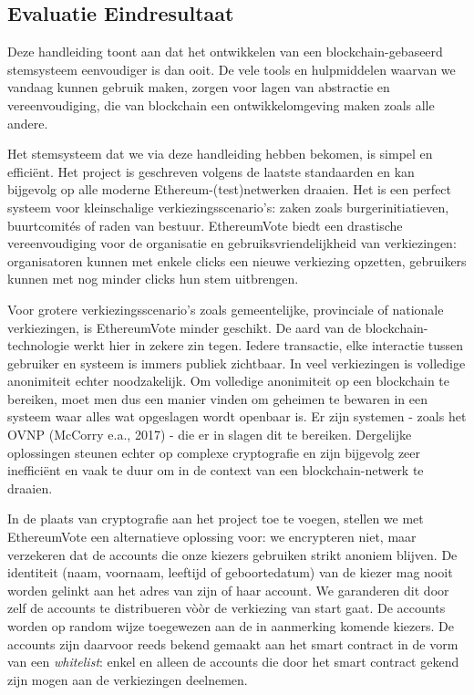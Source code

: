 	\subsection{Evaluatie Eindresultaat}
	Deze handleiding toont aan dat het ontwikkelen van een blockchain-gebaseerd stemsysteem eenvoudiger is dan ooit. De vele tools en hulpmiddelen waarvan we vandaag kunnen gebruik maken, zorgen voor lagen van abstractie en vereenvoudiging, die van blockchain een ontwikkelomgeving maken zoals alle andere.

	 Het stemsysteem dat we via deze handleiding hebben bekomen, is simpel en efficiënt. Het project is geschreven volgens de laatste standaarden en kan bijgevolg op alle moderne Ethereum-(test)netwerken draaien. Het is een perfect systeem voor kleinschalige verkiezingsscenario's: zaken zoals burgerinitiatieven, buurtcomités of raden van bestuur. EthereumVote biedt een drastische vereenvoudiging voor de organisatie en gebruiksvriendelijkheid van verkiezingen: organisatoren kunnen met enkele clicks een nieuwe verkiezing opzetten, gebruikers kunnen met nog minder clicks hun stem uitbrengen.
	 
	 Voor grotere verkiezingsscenario's zoals gemeentelijke, provinciale of nationale verkiezingen, is EthereumVote minder geschikt. De aard van de blockchain-technologie werkt hier in zekere zin tegen. Iedere transactie, elke interactie tussen gebruiker en systeem is immers publiek zichtbaar. In veel verkiezingen is volledige anonimiteit echter noodzakelijk. Om volledige anonimiteit op een blockchain te bereiken, moet men dus een manier vinden om geheimen te bewaren in een systeem waar alles wat opgeslagen wordt openbaar is. Er zijn systemen - zoals het OVNP (McCorry e.a., 2017) - die er in slagen dit te bereiken. Dergelijke oplossingen steunen echter op complexe cryptografie en zijn bijgevolg zeer inefficiënt en vaak te duur om in de context van een blockchain-netwerk te draaien.
	
	In de plaats van cryptografie aan het project toe te voegen, stellen we met EthereumVote een alternatieve oplossing voor: we encrypteren niet, maar verzekeren dat de accounts die onze kiezers gebruiken strikt anoniem blijven. De identiteit (naam, voornaam, leeftijd of geboortedatum) van de kiezer mag nooit worden gelinkt aan het adres van zijn of haar account. We garanderen dit door zelf de accounts te distribueren vòòr de verkiezing van start gaat. De accounts worden op random wijze toegewezen aan de in aanmerking komende kiezers. De accounts zijn daarvoor reeds bekend gemaakt aan het smart contract in de vorm van een \textit{whitelist}: enkel en alleen de accounts die door het smart contract gekend zijn mogen aan de verkiezingen deelnemen. 
	
